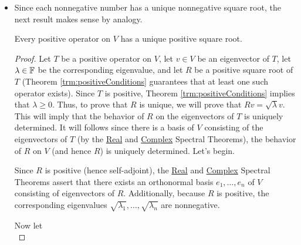 \documentclass[../main.tex]{subfiles}
\begin{document}
\begin{itemize}
\begin{theorem}
\begin{proof}
            Fifth, suppose that there exists an operator $R\in\ope{V}$ such that $T=R^*R$. To prove that $T$ is positive, it will suffice to show that it is self-adjoint and that $\inp{Tv}{v}\geq 0$ for all $v\in V$. First off, $T$ is self-adjoint since
            \begin{equation*}
                T^* = (R^*R)^* = R^*(R^*)^* = R^*R = T
            \end{equation*}
            Second, we have that
            \begin{equation*}
                \inp{Tv}{v} = \inp{R^*Rv}{v} = \inp{Rv}{Rv} \geq 0
            \end{equation*}
            for all $v\in V$. Therefore, $T$ is positive, as desired.
        \end{proof}
    \end{theorem}
    \item Since each nonnegative number has a unique nonnegative square root, the next result makes sense by analogy.
    \begin{theorem}
        Every positive operator on $V$ has a unique positive square root.
        \begin{proof}
            Let $T$ be a positive operator on $V$, let $v\in V$ be an eigenvector of $T$, let $\lambda\in\mathbb{F}$ be the corresponding eigenvalue, and let $R$ be a positive square root of $T$ (Theorem \ref{trm:positiveConditions} guarantees that at least one such operator exists). Since $T$ is positive, Theorem \ref{trm:positiveConditions} implies that $\lambda\geq 0$. Thus, to prove that $R$ is unique, we will prove that $Rv=\sqrt{\lambda}v$. This will imply that the behavior of $R$ on the eigenvectors of $T$ is uniquely determined. It will follows since there is a basis of $V$ consisting of the eigenvectors of $T$ (by the \hyperref[trm:RealSpectral]{Real} and \hyperref[trm:ComplexSpectral]{Complex} Spectral Theorems), the behavior of $R$ on $V$ (and hence $R$) is uniquely determined. Let's begin.\par\smallskip
            Since $R$ is positive (hence self-adjoint), the \hyperref[trm:RealSpectral]{Real} and \hyperref[trm:ComplexSpectral]{Complex} Spectral Theorems assert that there exists an orthonormal basis $e_1,\dots,e_n$ of $V$ consisting of eigenvectors of $R$. Additionally, because $R$ is positive, the corresponding eigenvalues $\sqrt{\lambda_1},\dots,\sqrt{\lambda_n}$ are nonnegative.\par
            Now let
            \begin{equation*}

\end{equation*}
\end{proof}
\end{theorem}
\end{itemize}
\end{document}
